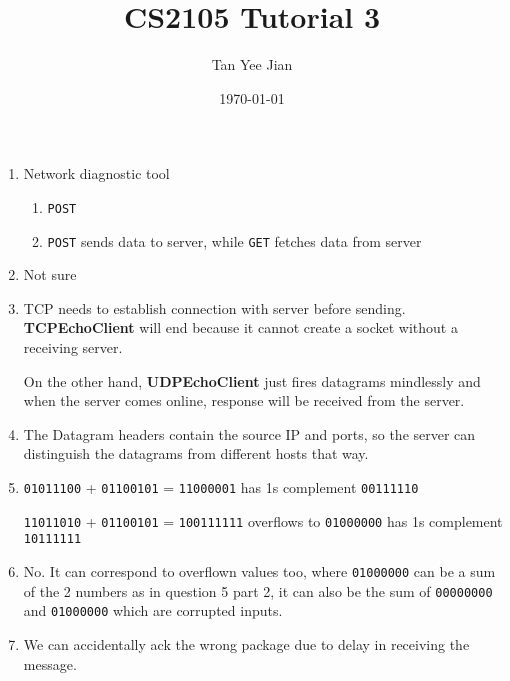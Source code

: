 \documentclass[11pt]{article}
\author{Tan Yee Jian}
\date{\today}
\title{CS2105 Tutorial 3}
\begin{document}
\maketitle
\tableofcontents

\begin{enumerate}
\item Network diagnostic tool
\begin{enumerate}
\item \texttt{POST}
\item \texttt{POST} sends data to server, while \texttt{GET} fetches data from server
\end{enumerate}
\item Not sure
\item TCP needs to establish connection with server before sending. \textbf{TCPEchoClient}
will end because it cannot create a socket without a receiving server.

On the other hand, \textbf{UDPEchoClient} just fires datagrams mindlessly and when
the server comes online, response will be received from the server.
\item The Datagram headers contain the source IP and ports, so the server can distinguish
the datagrams from different hosts that way.
\item \texttt{01011100} +
\texttt{01100101} =
\texttt{11000001} has 1s complement \texttt{00111110}

\texttt{11011010} +
\texttt{01100101} =
\texttt{100111111} overflows to \texttt{01000000} has 1s complement \texttt{10111111}
\item No. It can correspond to overflown values too, where \texttt{01000000} can be a sum
of the 2 numbers as in question 5 part 2, it can also be the sum of
\texttt{00000000} and \texttt{01000000} which are corrupted inputs.
\item We can accidentally ack the wrong package due to delay in receiving the message.
\end{enumerate}
\end{document}

